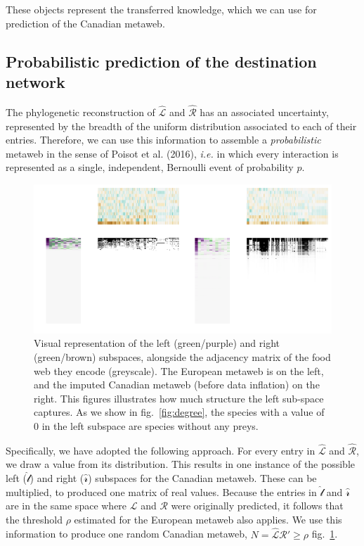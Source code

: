 \documentclass[11pt]{article}
\makeatletter
\def\maxwidth{\ifdim\Gin@nat@width>\linewidth\linewidth
\else\Gin@nat@width\fi}
\let\Oldincludegraphics\includegraphics
\renewcommand{\includegraphics}[1]{\Oldincludegraphics[width=\maxwidth]{#1}}
\makeatother
\begin{document}
These objects represent the transferred knowledge, which we can use for
prediction of the Canadian metaweb.

\hypertarget{probabilistic-prediction-of-the-destination-network}{%
\subsection{Probabilistic prediction of the destination
network}\label{probabilistic-prediction-of-the-destination-network}}

The phylogenetic reconstruction of \(\hat{\mathcal{L}}\) and
\(\hat{\mathcal{R}}\) has an associated uncertainty, represented by the
breadth of the uniform distribution associated to each of their entries.
Therefore, we can use this information to assemble a
\emph{probabilistic} metaweb in the sense of Poisot et al. (2016),
\emph{i.e.} in which every interaction is represented as a single,
independent, Bernoulli event of probability \(p\).

\begin{figure}
\hypertarget{fig:subspaces}{%
\centering
\includegraphics{figures/figure-subspaces.png}
\caption{Visual representation of the left (green/purple) and right
(green/brown) subspaces, alongside the adjacency matrix of the food web
they encode (greyscale). The European metaweb is on the left, and the
imputed Canadian metaweb (before data inflation) on the right. This
figures illustrates how much structure the left sub-space captures. As
we show in fig.~\ref{fig:degree}, the species with a value of 0 in the
left subspace are species without any preys.}\label{fig:subspaces}
}
\end{figure}

Specifically, we have adopted the following approach. For every entry in
\(\hat{\mathcal{L}}\) and \(\hat{\mathcal{R}}\), we draw a value from
its distribution. This results in one instance of the possible left
(\(\hat{\mathcal{l}}\)) and right (\(\hat{\mathcal{r}}\)) subspaces for
the Canadian metaweb. These can be multiplied, to produced one matrix of
real values. Because the entries in \(\hat{\mathcal{l}}\) and
\(\hat{\mathcal{r}}\) are in the same space where \(\mathcal{L}\) and
\(\mathcal{R}\) were originally predicted, it follows that the threshold
\(\rho\) estimated for the European metaweb also applies. We use this
information to produce one random Canadian metaweb,
\(N = \hat{\mathcal{L}}\)\(\hat{\mathcal{R}}' \ge \rho\)
fig.~\ref{fig:subspaces}.
\end{document}
